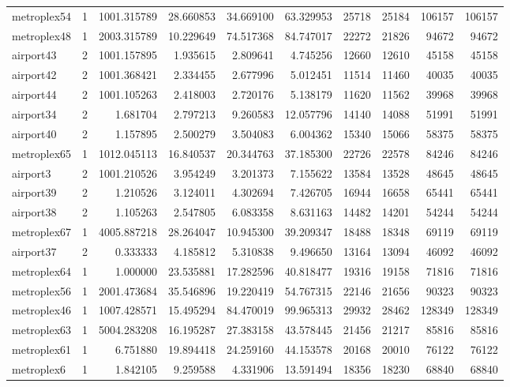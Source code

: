 \begin{longtable}{|l|r|r|r|r|r|r|r|r|r|}
metroplex54 & 1 & 1001.315789 & 28.660853 & 34.669100 & 63.329953 & 25718 & 25184 & 106157 & 106157 \\
metroplex48 & 1 & 2003.315789 & 10.229649 & 74.517368 & 84.747017 & 22272 & 21826 & 94672 & 94672 \\
airport43 & 2 & 1001.157895 & 1.935615 & 2.809641 & 4.745256 & 12660 & 12610 & 45158 & 45158 \\
airport42 & 2 & 1001.368421 & 2.334455 & 2.677996 & 5.012451 & 11514 & 11460 & 40035 & 40035 \\
airport44 & 2 & 1001.105263 & 2.418003 & 2.720176 & 5.138179 & 11620 & 11562 & 39968 & 39968 \\
airport34 & 2 & 1.681704 & 2.797213 & 9.260583 & 12.057796 & 14140 & 14088 & 51991 & 51991 \\
airport40 & 2 & 1.157895 & 2.500279 & 3.504083 & 6.004362 & 15340 & 15066 & 58375 & 58375 \\
metroplex65 & 1 & 1012.045113 & 16.840537 & 20.344763 & 37.185300 & 22726 & 22578 & 84246 & 84246 \\
airport3 & 2 & 1001.210526 & 3.954249 & 3.201373 & 7.155622 & 13584 & 13528 & 48645 & 48645 \\
airport39 & 2 & 1.210526 & 3.124011 & 4.302694 & 7.426705 & 16944 & 16658 & 65441 & 65441 \\
airport38 & 2 & 1.105263 & 2.547805 & 6.083358 & 8.631163 & 14482 & 14201 & 54244 & 54244 \\
metroplex67 & 1 & 4005.887218 & 28.264047 & 10.945300 & 39.209347 & 18488 & 18348 & 69119 & 69119 \\
airport37 & 2 & 0.333333 & 4.185812 & 5.310838 & 9.496650 & 13164 & 13094 & 46092 & 46092 \\
metroplex64 & 1 & 1.000000 & 23.535881 & 17.282596 & 40.818477 & 19316 & 19158 & 71816 & 71816 \\
metroplex56 & 1 & 2001.473684 & 35.546896 & 19.220419 & 54.767315 & 22146 & 21656 & 90323 & 90323 \\
metroplex46 & 1 & 1007.428571 & 15.495294 & 84.470019 & 99.965313 & 29932 & 28462 & 128349 & 128349 \\
metroplex63 & 1 & 5004.283208 & 16.195287 & 27.383158 & 43.578445 & 21456 & 21217 & 85816 & 85816 \\
metroplex61 & 1 & 6.751880 & 19.894418 & 24.259160 & 44.153578 & 20168 & 20010 & 76122 & 76122 \\
metroplex6 & 1 & 1.842105 & 9.259588 & 4.331906 & 13.591494 & 18356 & 18230 & 68840 & 68840 \\

\end{longtable}
